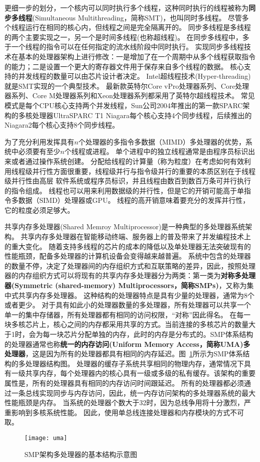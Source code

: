 更细一步的划分，一个核内可以同时执行多个线程，这种同时执行的线程被称为\textbf{同步多线程}(Simultaneous Multithreading，简称SMT)，也叫同时多线程。
尽管多个线程运行在相同的核心内，但线程之间是完全隔离开的。
同步多线程是多线程的两个主要实现之一，另一个是时间多线程(也称超线程)。
在同步多线程中，多于一个线程的指令可以在任何指定的流水线阶段中同时执行。
实现同步多线程技术在基本的处理器架构上进行修改：一是增加了在一个周期中从多个线程获取指令的能力；二是设置一个更大的寄存器文件用于保存来自多个线程的数据。
核心支持的并发线程的数量可以由芯片设计者决定。
Intel超线程技术(Hyper-threading)就是SMT实现的一个典型技术\cite{marr2002hyper}。
最新款英特尔Core vPro处理器系列\cite{samson2005interface}、Core处理器系列\cite{lempel20112nd}、Core M处理器系列和Xeon处理器系列\cite{chang200765}都采用了英特尔超线程技术。
常见模式是每个CPU核心支持两个并发线程，Sun公司2004年推出的第一款SPARC架构的多核处理器UltraSPARC T1 Niagara每个核心支持4个同步线程\cite{kongetira2005niagara}，后续推出的Niagara2每个核心支持8个同步线程。

为了充分利用发挥具有$n$个处理器的多指令多数据（MIMD）多处理器的优势，系统中必须要有至少$n$个线程或进程。
单个进程中的独立线程通常是由程序员标识出来或者通过操作系统创建。
分配给线程的计算量（称为粒度）在考虑如何有效利用线程级并行性方面很重要，线程级并行与指令级并行的重要的本质区别在于线程级并行性由高层 软件系统或程序员标识，并且线程由数百到数百万条可并行执行的指令组成。
线程也可以用来利用数据级的并行性，但是它的开销可能高于单指令多数据（SIMD）处理器或GPU\cite{shi2012vcuda}。
线程的高开销意味着要充分的发挥并行性，它的粒度必须足够大。

共享内存多处理器(Shared Memroy Multiprocessor)是一种典型的多处理器系统架构。
共享内存多处理器在智能移动终端、服务器上的普及带来了并发编程技术上的重大变化。
随着支持多线程的芯片的成本的降低以及单处理器无法突破现有的性能瓶颈，配备多处理器的计算机设备会变得越来越普遍。
系统中包含的处理器的数量不停，决定了处理器间的内存组织方式和互联策略的差异，因此，按照处理器的内存组织方式可以将现有的共享内存多处理器分为两类：第一类为\textbf{对称多处理器(Symmetric (shared-memory) Multiprocessors，简称SMPs)}，又称为集中式共享内存多处理器。
	这种结构的处理器特点是具有少量的处理器，通常为8个或者更少。
	对于具有如此小的处理器数量的多处理器，所有处理器可以共享一个单一的集中存储器，所有处理器都有相同的访问权限，“对称”因此得名。
	在每一块多核芯片上，核心之间的内存都采用共享的方式。当前连接的多核芯片的数量大于1时，会为每一块芯片分配单独的内存，此时的内存是分布式的。SMP体系结构的处理器通常也称\textbf{统一的内存访问(Uniform Memory Access，简称UMA)多处理器}，这是因为所有的处理器都具有相同的内存延迟。图~\ref{fig:uma}所示为SMP体系结构的多处理器结构图。
	处理器的缓存子系统共享相同的物理内存，通常情况下具有一级共享内存，每个处理器内的核心具有一级或多级的私有缓存。该架构的重要属性是，所有的处理器具有相同的内存访问时间跟延迟。
	所有的处理器都必须通过一条总线实现同步与内存访问，因此，统一内存访问架构的多处理器系统的最大性能瓶颈是内存。
	当系统的处理器个数大于32时，因为总线争用将十分激烈，严重影响到多核系统性能。
	因此，使用单总线连接处理器和内存模块的方式不可取。
\begin{figure}
\centering
\texttt{[image: uma]}
\caption{SMP架构多处理器的基本结构示意图}
\label{fig:uma}
\end{figure}
	

